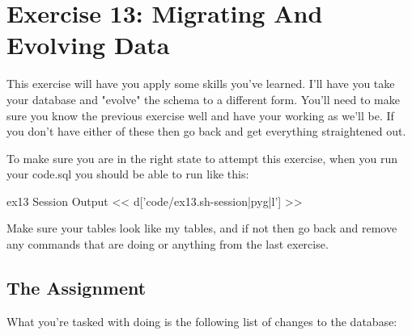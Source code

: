 \chapter{Exercise 13: Migrating And Evolving Data}

This exercise will have you apply some skills you've learned.  I'll have you
take your database and "evolve" the schema to a different form.  You'll need to
make sure you know the previous exercise well and have your 
working as we'll be.  If you don't have either of these then go back and get
everything straightened out.

To make sure you are in the right state to attempt this exercise, when you run
your code.sql you should be able to run  like this:

\begin{code}{ex13 Session Output}
<< d['code/ex13.sh-session|pyg|l'] >>
\end{code}

Make sure your tables look like my tables, and if not then go back and 
remove any commands that are doing  or anything from
the last exercise.

\section{The Assignment}

What you're tasked with doing is the following list of changes to 
the database:


